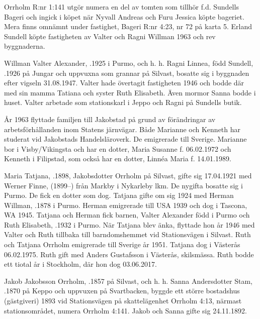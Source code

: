Orrholm R:nr 1:141 utgör numera en del av tomten som tillhör  f.d. Sundells Bageri och ingick i köpet när  Nyvall Andreas och Furu Jessica köpte bageriet. Mera finns omnämnt under fastighet, Bageri R:nr 4:23, nr 72 på karta 5. Erland Sundell köpte fastigheten av Valter och Ragni Willman 1963 och rev byggnaderna.


Willman Valter Alexander, .1925  i Purmo, och h. h. Ragni Linnea, född Sundell, .1926 på Jungar och uppvuxna som grannar på Silvast, bosatte sig i byggnaden efter vigseln 31.08.1947. Valter hade övertagit fastigheten 1946 och bodde där med sin mamma Tatiana och syster Ruth Elisabeth. Även mormor Sanna bodde i huset. Valter arbetade som stationskarl i Jeppo och Ragni på Sundells butik.
\begin{jhchildren}
  \item {}
  \item {}
\end{jhchildren}
År 1963 flyttade familjen till Jakobstad på grund av förändringar av arbetsförhållanden inom Statens järnvägar. Både Marianne och Kenneth har studerat vid Jakobstads Handelsläroverk. De emigrerade till Sverige. Marianne bor i Visby/Vikingsta och har en dotter, Maria Susanne f. 06.02.1972 och Kenneth i Filipstad, som också har en dotter, Linnéa Maria f. 14.01.1989.

Maria Tatjana, .1898, Jakobsdotter Orrholm på Silvast, gifte sig 17.04.1921 med Werner Finne, (1899--) från Markby i Nykarleby lkm. De nygifta bosatte sig i Purmo. De fick en dotter som dog. Tatjana gifte om sig 1924 med Herman Willman, .1878 i Purmo. Herman emigrerade till USA 1939 och dog i Tascona, WA 1945. Tatjana och Herman fick barnen, Valter Alexander född i Purmo och Ruth Elisabeth, .1932 i Purmo. När Tatjana blev änka, flyttade hon år 1946 med Valter och Ruth tillbaka till barndomshemmet vid Stationsvägen i Silvast. Ruth och Tatjana Orrholm emigrerade till Sverige år 1951. Tatjana dog i Västerås 06.02.1975. Ruth gift med Anders Gustafsson i Västerås, skilsmässa. Ruth bodde ett tiotal år i Stockholm, där hon dog 03.06.2017.


Jakob Jakobsson Orrholm, .1857 på Silvast, och h. h. Sanna Andersdotter Stam, .1870 på Keppo och uppvuxen på Svartbacken, byggde ett större bostadshus (gästgiveri) 1893 vid Stationsvägen på skattelägenhet Orrholm 4:13, närmast stationsområdet, numera Orrholm 4:141. Jakob och Sanna gifte sig 24.11.1892.

